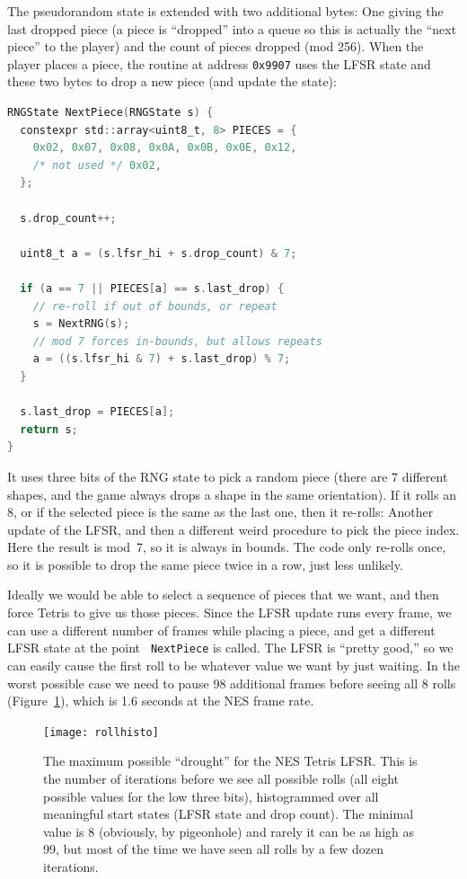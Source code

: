 \documentclass[twocolumn]{article}
\begin{document}
The pseudorandom state is extended with two additional bytes: One
giving the last dropped piece (a piece is ``dropped'' into a queue so
this is actually the ``next piece'' to the player) and the count of
pieces dropped (mod 256). When the player places a piece, the routine
at address {\tt 0x9907} uses the LFSR state and these two bytes to
drop a new piece (and update the state):

\begin{lstlisting}[language=C]
RNGState NextPiece(RNGState s) {
  constexpr std::array<uint8_t, 8> PIECES = {
    0x02, 0x07, 0x08, 0x0A, 0x0B, 0x0E, 0x12,
    /* not used */ 0x02,
  };

  s.drop_count++;

  uint8_t a = (s.lfsr_hi + s.drop_count) & 7;

  if (a == 7 || PIECES[a] == s.last_drop) {
    // re-roll if out of bounds, or repeat
    s = NextRNG(s);
    // mod 7 forces in-bounds, but allows repeats
    a = ((s.lfsr_hi & 7) + s.last_drop) % 7;
  }
  
  s.last_drop = PIECES[a];
  return s;
}
\end{lstlisting}

It uses three bits of the RNG state to pick a random piece (there are
7 different shapes, and the game always drops a shape in the same
orientation). If it rolls an 8, or if the selected piece is the same
as the last one, then it re-rolls: Another update of the LFSR, and
then a different weird procedure to pick the piece index. Here the
result is {\sf mod}~7, so it is always in bounds. The code only
re-rolls once, so it is possible to drop the same piece twice in
a row, just less unlikely.

Ideally we would be able to select a sequence of pieces that we want,
and then force Tetris to give us those pieces. Since the LFSR update
runs every frame, we can use a different number of frames while
placing a piece, and get a different LFSR state at the point {\tt
  NextPiece} is called. The LFSR is ``pretty good,'' so we can easily
cause the first roll to be whatever value we want by just waiting. In
the worst possible case we need to pause 98 additional frames before
seeing all 8 rolls (Figure~\ref{fig:rollhisto}), which is 1.6 seconds
at the NES frame rate.

\begin{figure}
  \centering
  \texttt{[image: rollhisto]}
  \caption {
    The maximum possible ``drought'' for the NES Tetris LFSR. This is
    the number of iterations before we see all possible rolls (all
    eight possible values for the low three bits), histogrammed
    over all meaningful start states (LFSR state and drop count).
    The minimal value is 8 (obviously, by pigeonhole) and rarely
    it can be as high as 99, but most of the time we have seen
    all rolls by a few dozen iterations.
    } \label{fig:rollhisto}
\end{figure}
\end{document}

